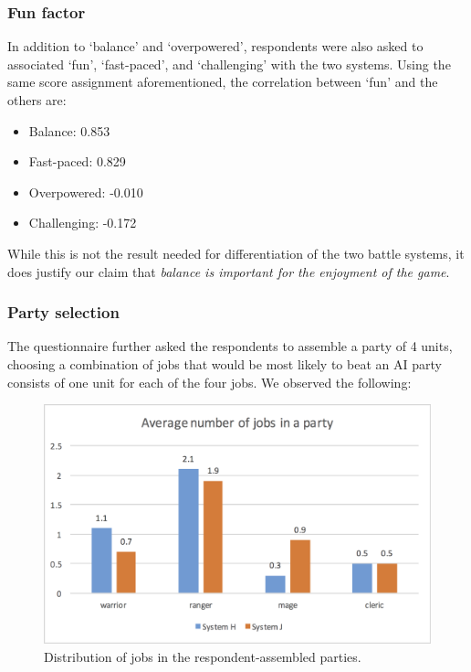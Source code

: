\subsubsection*{Fun factor}

In addition to `balance' and `overpowered', respondents were also asked to associated `fun', `fast-paced', and `challenging' with the two systems. Using the same score assignment aforementioned, the correlation between `fun' and the others are:
\begin{itemize}
	\item Balance: 0.853
	\item Fast-paced: 0.829
	\item Overpowered: -0.010
	\item Challenging: -0.172
\end{itemize}

While this is not the result needed for differentiation of the two battle systems, it does justify our claim that \textit{balance is important for the enjoyment of the game}.

\subsubsection*{Party selection}

The questionnaire further asked the respondents to assemble a party of 4 units, choosing a combination of jobs that would be most likely to beat an AI party consists of one unit for each of the four jobs. We observed the following:

\begin{figure}
	\centering
	\includegraphics[width=0.6\linewidth]{figures/jobs_per_party}
	\caption{Distribution of jobs in the respondent-assembled parties.}
	\label{fig:jobs_per_party}
\end{figure}

